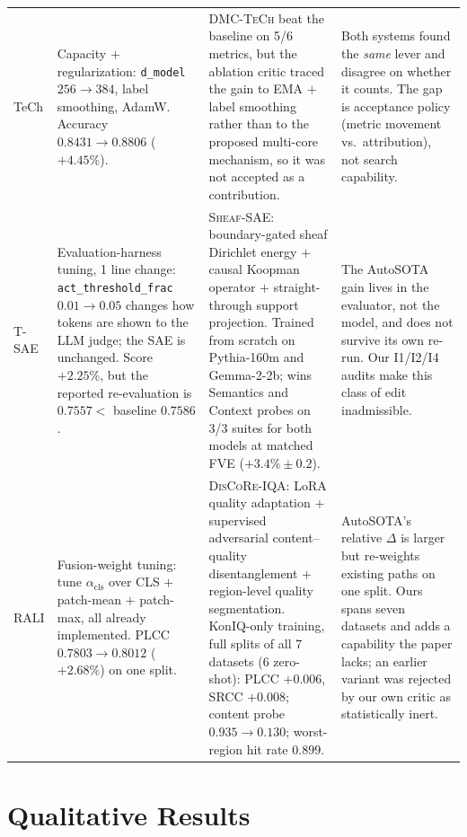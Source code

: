 \begin{table}[h!]
\begin{tabular}{@{}p{}p{}p{}p{}@{}}
TeCh \newline \citep{yu2026decentralized}
& Capacity $+$ regularization: \texttt{d\_model} $256\!\to\!384$, label smoothing, AdamW.
  Accuracy $0.8431\!\to\!0.8806$ ($+4.45\%$).
& \textsc{DMC-TeCh} beat the baseline on 5/6 metrics, but the ablation critic traced the gain to
  EMA $+$ label smoothing rather than to the proposed multi-core mechanism, so it was not
  accepted as a contribution.
& Both systems found the \emph{same} lever and disagree on whether it counts. The gap is
  acceptance policy (metric movement vs.\ attribution), not search capability. \\
\addlinespace

T-SAE \newline \citep{bhalla2026temporal}
& Evaluation-harness tuning, 1 line change: \texttt{act\_threshold\_frac} $0.01\!\to\!0.05$ changes how
  tokens are shown to the LLM judge; the SAE is unchanged. Score $+2.25\%$, but the reported
  re-evaluation is $0.7557 <$ baseline $0.7586$.
& \textsc{Sheaf-SAE}: boundary-gated sheaf Dirichlet energy $+$ causal Koopman operator $+$
  straight-through support projection. Trained from scratch on Pythia-160m and Gemma-2-2b; wins
  Semantics and Context probes on 3/3 suites for both models at matched FVE ($+3.4\%{\pm}0.2$).
& The AutoSOTA gain lives in the evaluator, not the model, and does not survive its own re-run.
  Our I1/I2/I4 audits make this class of edit inadmissible. \\
\addlinespace

RALI \newline \citep{zhao2026reasoning}
& Fusion-weight tuning: tune $\alpha_{\mathrm{cls}}$ over CLS $+$ patch-mean $+$ patch-max, all
  already implemented. PLCC $0.7803\!\to\!0.8012$ ($+2.68\%$) on one split.
& \textsc{DisCoRe-IQA}: LoRA quality adaptation $+$ supervised adversarial content--quality
  disentanglement $+$ region-level quality segmentation. KonIQ-only training, full splits of all
  7 datasets (6 zero-shot): PLCC $+0.006$, SRCC $+0.008$; content probe $0.935\!\to\!0.130$;
  worst-region hit rate $0.899$.
& AutoSOTA's relative $\Delta$ is larger but re-weights existing paths on one split. Ours spans
  seven datasets and adds a capability the paper lacks; an earlier variant was rejected by our
  own critic as statistically inert. \\
\bottomrule
\end{tabular}
\end{table}


\newpage
\section{Qualitative Results}\label{app:qual_results}

